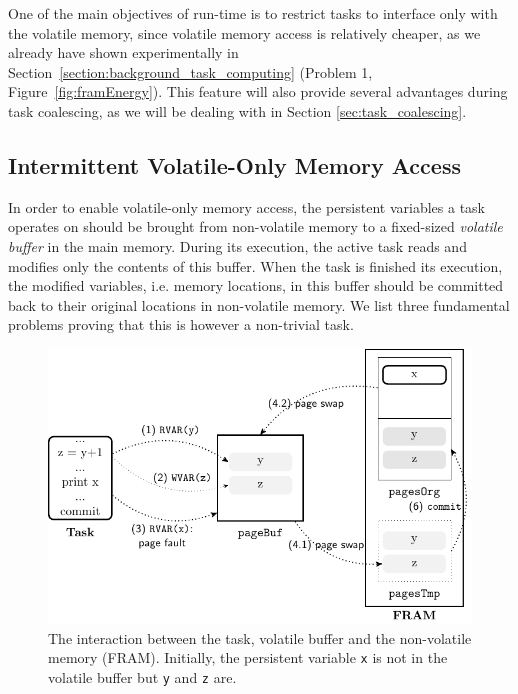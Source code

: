 One of the main objectives of \sys run-time is to restrict tasks to interface only with the volatile memory, since volatile memory access is relatively cheaper, as we already have shown experimentally in Section~\ref{section:background_task_computing} (Problem 1, Figure~\ref{fig:framEnergy}). This feature will also provide several advantages during task coalescing, as we will be dealing with in Section \ref{sec:task_coalescing}.

\subsection{Intermittent Volatile-Only Memory Access}
\label{sec:virtualization_problems}

In order to enable volatile-only memory access, the persistent variables a task operates on should be brought from non-volatile memory to a fixed-sized \emph{volatile buffer} in the main memory. During its execution, the active task reads and modifies only the contents of this buffer. When the task is finished its execution, the modified variables, i.e. memory locations, in this buffer should be committed back to their original locations in non-volatile memory. We list three fundamental problems proving that this is however a non-trivial task. 

\begin{figure}[t]
	\centering
	\includegraphics[width=\columnwidth]{figures/sram-buffer}
	\caption{The interaction between the task, volatile buffer and the non-volatile memory (FRAM). Initially, the persistent variable \texttt{x} is not in the volatile buffer but \texttt{y} and \texttt{z} are.}
	\label{fig:volatile-buffer}
\end{figure}

